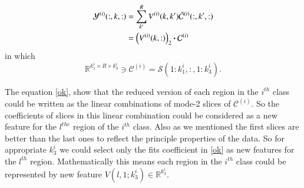 \documentclass[preprint,12pt]{elsarticle}
\newcommand{\trans}{\mathsf{T}}
\begin{document}
\begin{align}
\label{ok}
{\mathcal{Y}}^{(i)}(:,k,:) &= \sum_{k'}^{R} V^{(i)}(k,k')\bar{\mathcal{C}}^{(i)}(:,k',:) \notag
\\&= \left( V^{(i)}(k,:)\right)_2 \boldsymbol{\cdot} {\mathcal{C}}^{(i)}
\end{align}
in which 
\[
\mathbb{R}^{k_1^i\times R \times k_3^i}\ni {\mathcal{C}}^{(i)} = \mathcal{S}(1:k_1^i,:,1:k_3^i).
\]

The equation \eqref{ok}, show that the reduced version of each region in the $i^{th}$ class could be
written as the linear combinations of  mode-2 slices of $\mathcal{C}^{(i)}$. So the coefficients of slices in this linear combination could be considered as a new feature for the $l^{the}$ region of the $i^{th}$ class. Also as we mentioned the first slices are better than the last ones to reflect the principle properties of the data. So for appropriate $k_3^i$ we could select only the fits coefficient in \eqref{ok} as  new features for the $l^{th}$ region. Mathematically this means each region  in the $i^{th}$ class could be represented by new feature $V(l,1;k_3^i)\in \mathbb{R}^{k_3^i}$.   
\end{document}
